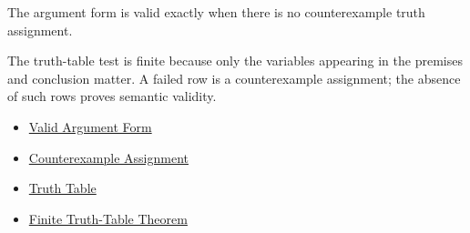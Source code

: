 \begin{remark*}
The argument form is valid exactly when there is no counterexample truth
assignment.
\end{remark*}

\begin{remark*}[Interpretation]
The truth-table test is finite because only the variables appearing in the
premises and conclusion matter. A failed row is a counterexample assignment; the
absence of such rows proves semantic validity.
\end{remark*}

\begin{dependencies}
\begin{itemize}
  \item \hyperref[def:valid-argument-form-propositional-logic]{Valid Argument Form}
  \item \hyperref[def:counterexample-assignment-propositional-logic]{Counterexample Assignment}
  \item \hyperref[def:truth-table-propositional-logic]{Truth Table}
  \item \hyperref[thm:finite-truth-table-propositional-logic]{Finite Truth-Table Theorem}
\end{itemize}
\end{dependencies}
